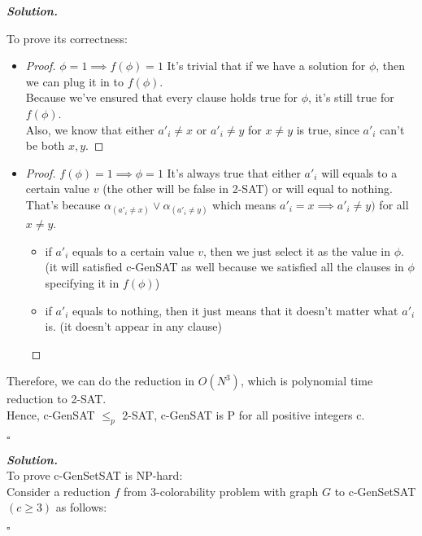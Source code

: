 \documentclass[12pt, a4paper, UTF8]{article}
\newenvironment{solution}[1][\it{Solution}]{\textbf{#1. }\\}{\begin{flushright}$\square$\end{flushright}}
\begin{document}
\begin{subprobs}
\begin{subprobs}
\begin{solution}
\begin{itemize}
        \end{itemize}
        To prove its correctness:
        \begin{itemize}
            \item 
                \begin{proof} $\phi = 1 \implies f(\phi) = 1$ 
                    It's trivial that if we have a solution for $\phi$, then we can plug it in to $f(\phi)$.\\
                    Because we've ensured that every clause holds true for $\phi$, it's still true for $f(\phi)$.\\
                    Also, we know that either $a'_i \neq x$ or $a'_i \neq y$ for $x \neq y$ is true, since $a'_i$ can't be both $x, y$. 
                \end{proof}                    
            \item 
                \begin{proof} $f(\phi) = 1 \implies \phi = 1$
                    It's always true that either $a'_i$ will equals to a certain value $v$ (the other will be false in 2-SAT) or will equal to nothing.\\
                    That's because $\alpha_{(a'_i \neq x)} \vee \alpha_{(a'_i \neq y)}$ which means $a'_i = x \implies a'_i \neq y)$ for all $x \neq y$.
                    \begin{itemize}
                        \item if $a'_i$ equals to a certain value $v$, then we just select it as the value in $\phi$. (it will satisfied c-GenSAT as well because we satisfied all the clauses in $\phi$ specifying it in $f(\phi)$)
                        \item if $a'_i$ equals to nothing, then it just means that it doesn't matter what $a'_i$ is. (it doesn't appear in any clause)
                    \end{itemize}
                \end{proof}
        \end{itemize}
        Therefore, we can do the reduction in $O(N^3)$, which is polynomial time reduction to 2-SAT.\\
        Hence, c-GenSAT $\le_p$ 2-SAT, c-GenSAT is P for all positive integers c.
    \end{solution}
\item
    \begin{solution}
        To prove c-GenSetSAT is NP-hard:\\
        Consider a reduction $f$ from 3-colorability problem with graph $G$ to c-GenSetSAT $(c \ge 3)$ as follows:

\end{solution}
\end{subprobs}
\end{subprobs}
\end{document}
